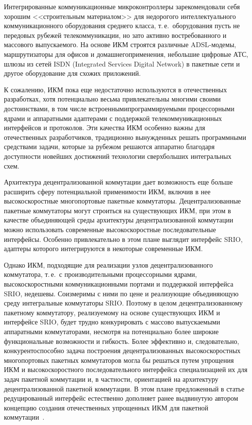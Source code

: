 \begin{multicols}{2}
\vspace*{-2pt}
     
Интегрированные коммуникационные микроконтроллеры зарекомендовали себя хорошим <<строительным материалом>> для недорогого 
интеллектуального коммуникационного оборудования среднего класса, т.\,е.\ 
оборудования пусть не передовых рубежей телекоммуникации, но зато активно 
востребованного и массового выпускаемого. На основе ИКМ строятся различные 
     ADSL-мо\-де\-мы, маршрутизаторы для офисов и домашнего\linebreak применения, небольшие 
цифровые АТС, шлюзы из сетей ISDN (Integrated Services Digital Network)
в пакетные сети и другое оборудование для схожих 
приложений.
     
     К сожалению, ИКМ пока еще недостаточно используются в отечественных 
разработках, хотя потенциально весьма привлекательны многими своими достоинствами, в 
том числе встроенными\linebreak программируемыми процессорными ядрами и аппаратными 
адаптерами с поддержкой телекоммуникационных интерфейсов и протоколов. Эти качества 
ИКМ особенно важны для отечественных разработчиков, традиционно вынужденных решать 
программными средствами задачи, которые за рубежом решаются аппаратно благодаря 
доступности новейших достижений технологии сверхбольших интегральных схем.
     
     Архитектура децентрализованной коммутации дает возможность еще больше 
расширить сферу потенциальной применимости ИКМ, включив в нее высокоскоростные 
многопортовые пакетные коммутаторы. Децентрализованные пакетные коммутаторы могут 
строиться на существующих ИКМ, при этом в качестве объединяющей среды архитектуры 
децентрализованной коммутации можно использовать современные высокоскоростные 
последовательные интерфейсы. Особенно привлекательно в этом плане выглядит интерфейс 
SRIO, адаптеры которого интегрируются в некоторые современные ИКМ.
     
     Однако ИКМ, подходящие для реализации узлов децентрализованного коммутатора, т.\,е.\
      с производительными процессорными ядрами, высокоскоростными 
коммуникационными портами и\linebreak
 поддержкой интерфейса SRIO, недешевы. Соизмеримы с 
ними по цене и реализующие объединяющую среду интегральные коммутаторы SRIO. 
Поэтому в целом децентрализованному пакетному коммутатору, реализуемому на основе 
существующих ИКМ и интерфейсе SRIO, будет трудно конкурировать с массово 
выпускаемыми аппаратными коммутаторами, несмотря на потенциально более широкие 
функциональные возможности и гибкость. Более эффективно и, следовательно, 
конкурентоспособно задача построения децентрализованных высокоскоростных 
многопортовых пакетных коммутаторов могла бы решаться путем упрощения ИКМ и 
высокоскоростного последовательного интерфейса специализацией их для задач пакетной 
коммутации и, в частности, ориентацией на архитектуру децентрализованной пакетной 
коммутации. В этом плане предложенный в статье редуцированный интерфейс естественно 
дополняет ранее выдвинутую автором концепцию создания отечественных упрощенных 
ИКМ для пакетной коммутации~\cite{8eg}.


\end{multicols}
